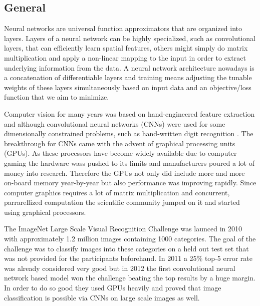 \documentclass[a4paper,12pt]{article}
\begin{document}
\vspace{7mm}

\subsection{General}

\vspace{7mm}

Neural networks are universal function approximators that are organized into layers. Layers of a neural network can be highly specialized, such as convolutional layers, that can efficiently learn spatial features, others might simply do matrix multiplication and apply a non-linear mapping to the input in order to extract underlying information from the data. A neural network architecture nowadays is a concatenation of differentiable layers and training means adjusting the tunable weights of these layers simultaneously based on input data and an objective/loss function that we aim to minimize.

\vspace{4mm}

\par Computer vision for many years was based on hand-engineered feature extraction and although convolutional neural networks (CNNs) were used for some dimensionally constrained problems, such as hand-written digit recognition \cite{lecun1998gradient}. The breakthrough for CNNs came with the advent of graphical processing units (GPUs). As these processors have become widely available due to computer gaming the hardware wass pushed to its limits and manufacturers poured a lot of money into research. Therefore the GPUs not only did include more and more on-board memory year-by-year but also performance was improving rapidly. Since computer graphics requires a lot of matrix multiplication and concurrent, parrarellized computation the scientific community jumped on it and started using graphical processors.

\vspace{4mm}

\par The ImageNet Large Scale Visual Recognition Challenge \cite{ILSVRC15} was launced in 2010 with approximately 1.2 million images containing 1000 categories. The goal of the challenge was to classify images into these categories on a held out test set that was not provided for the participants beforehand. In 2011 a 25\% top-5 error rate was already considered very good but in 2012 the first convolutional neural network based model \cite{krizhevsky2012imagenet} won the challenge beating the top results by a huge margin. In order to do so good they used GPUs heavily and proved that image classification is possible via CNNs on large scale images as well.
\end{document}
